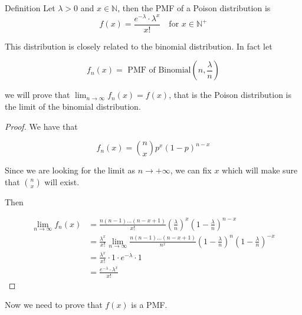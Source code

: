 \documentclass[10pt]{extarticle}
\newcommand{\N}{\mathbb{N}}
\begin{document}
\begin{bluebox}{Definition}
    Let $\lambda > 0$ and $x \in \N$, then the PMF of a Poison distribution is
    $$
        f(x) = \frac{e^{-\lambda} \cdot \lambda^x}{x!} \quad \text{for } x \in \N^+
    $$
\end{bluebox}

This distribution is closely related to the binomial distribution.
In fact let

$$
    f_n(x) = \text{ PMF of Binomial}(n, \frac{\lambda}{n})
$$

we will prove that $\lim_{n \to \infty} f_n(x) = f(x)$, that is the Poison distribution is the limit of the binomial distribution.

\begin{proof}
    We have that

    $$
        f_n(x) = \binom{n}{x} p^x (1 - p)^{n - x}
    $$

    Since we are looking for the limit as $n \to +\infty$, we can fix $x$ which will make sure that $\binom{n}{x}$ will exist.

    Then

    \begin{align*}
        \lim_{n \to \infty} f_n(x) & = \frac{n(n-1)\dots (n - x +1)}{x!} \left(\frac{\lambda}{n}\right)^x \left(1 - \frac{\lambda}{n}\right)^{n - x}                                           \\
                                   & = \frac{\lambda^x}{x!} \lim_{n \to \infty} \frac{n (n-1) \dots (n-x+1)}{n^x} \left(1 - \frac{\lambda}{n}\right)^n \left(1 - \frac{\lambda}{n}\right)^{-x} \\
                                   & = \frac{\lambda^x}{x!} \cdot 1 \cdot e^{-\lambda} \cdot 1                                                                                                 \\
                                   & = \frac{e^{-\lambda} \cdot \lambda^x}{x!}
    \end{align*}

\end{proof}

Now we need to prove that $f(x)$ is a PMF.
\end{document}
